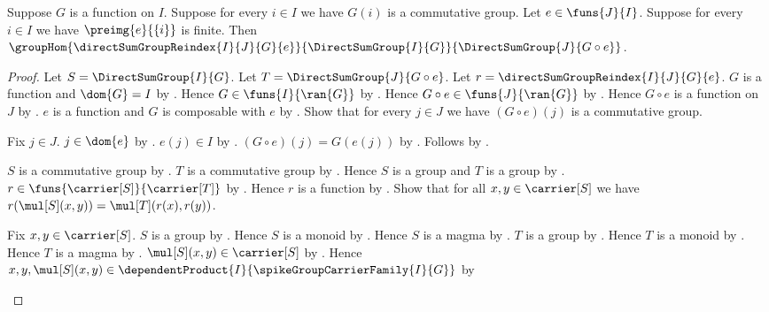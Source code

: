 \begin{theorem}\label{spike_direct_sum_group_reindex_hom}
    Suppose $G$ is a function on $I$.
    Suppose for every $i\in I$ we have $G(i)$ is a commutative group.
    Let $e\in\funs{J}{I}$.
    Suppose for every $i\in I$ we have
        $\preimg{e}{\{i\}}$ is finite.
    Then
        $\groupHom
            {\directSumGroupReindex{I}{J}{G}{e}}
            {\DirectSumGroup{I}{G}}
            {\DirectSumGroup{J}{G\circ e}}$.
\end{theorem}
\begin{proof}
    Let $S=\DirectSumGroup{I}{G}$.
    Let $T=\DirectSumGroup{J}{G\circ e}$.
    Let $r=\directSumGroupReindex{I}{J}{G}{e}$.
    $G$ is a function and $\dom{G}=I$ by \auto.
    Hence $G\in\funs{I}{\ran{G}}$ by
        .
    Hence $G\circ e\in\funs{J}{\ran{G}}$ by .
    Hence $G\circ e$ is a function on $J$ by
        .
    $e$ is a function and $G$ is composable with $e$ by
        .
    Show that for every $j\in J$ we have
        $(G\circ e)(j)$ is a commutative group.
    \begin{subproof}
        Fix $j\in J$.
        $j\in\dom{e}$ by .
        $e(j)\in I$ by .
        $(G\circ e)(j)=G(e(j))$ by .
        Follows by \auto.
    \end{subproof}
    $S$ is a commutative group by
        .
    $T$ is a commutative group by
        .
    Hence $S$ is a group and $T$ is a group by
        .
    $r\in\funs{\carrier[S]}{\carrier[T]}$ by
        .
    Hence $r$ is a function by .
    Show that for all $x,y\in\carrier[S]$ we have
        $r(\mul[S](x,y))=\mul[T](r(x),r(y))$.
    \begin{subproof}
        Fix $x,y\in\carrier[S]$.
        $S$ is a group by .
        Hence $S$ is a monoid by .
        Hence $S$ is a magma by .
        $T$ is a group by .
        Hence $T$ is a monoid by .
        Hence $T$ is a magma by .
        $\mul[S](x,y)\in\carrier[S]$ by .
        Hence $x,y,\mul[S](x,y)\in
            \dependentProduct
                {I}{\spikeGroupCarrierFamily{I}{G}}$ by

\end{subproof}
\end{proof}
